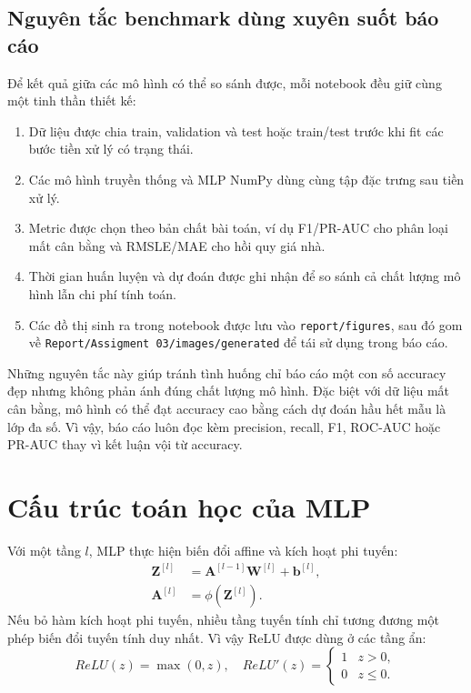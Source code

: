 \documentclass[12pt,a4paper]{report}
\newcommand{\modelpath}[1]{\texttt{#1}}
\begin{document}
\subsection{Nguyên tắc benchmark dùng xuyên suốt báo cáo}
Để kết quả giữa các mô hình có thể so sánh được, mỗi notebook đều giữ cùng một tinh thần thiết kế:
\begin{enumerate}
    \item Dữ liệu được chia train, validation và test hoặc train/test trước khi fit các bước tiền xử lý có trạng thái.
    \item Các mô hình truyền thống và MLP NumPy dùng cùng tập đặc trưng sau tiền xử lý.
    \item Metric được chọn theo bản chất bài toán, ví dụ F1/PR-AUC cho phân loại mất cân bằng và RMSLE/MAE cho hồi quy giá nhà.
    \item Thời gian huấn luyện và dự đoán được ghi nhận để so sánh cả chất lượng mô hình lẫn chi phí tính toán.
    \item Các đồ thị sinh ra trong notebook được lưu vào \modelpath{report/figures}, sau đó gom về \modelpath{Report/Assigment 03/images/generated} để tái sử dụng trong báo cáo.
\end{enumerate}

Những nguyên tắc này giúp tránh tình huống chỉ báo cáo một con số accuracy đẹp nhưng không phản ánh đúng chất lượng mô hình.
Đặc biệt với dữ liệu mất cân bằng, mô hình có thể đạt accuracy cao bằng cách dự đoán hầu hết mẫu là lớp đa số.
Vì vậy, báo cáo luôn đọc kèm precision, recall, F1, ROC-AUC hoặc PR-AUC thay vì kết luận vội từ accuracy.

\section{Cấu trúc toán học của MLP}
Với một tầng $l$, MLP thực hiện biến đổi affine và kích hoạt phi tuyến:
\begin{align}
    \mathbf{Z}^{[l]} &= \mathbf{A}^{[l-1]}\mathbf{W}^{[l]} + \mathbf{b}^{[l]}, \\
    \mathbf{A}^{[l]} &= \phi(\mathbf{Z}^{[l]}).
\end{align}
Nếu bỏ hàm kích hoạt phi tuyến, nhiều tầng tuyến tính chỉ tương đương một phép biến đổi tuyến tính duy nhất. Vì vậy ReLU được dùng ở các tầng ẩn:
\begin{equation}
    ReLU(z) = \max(0, z), \quad
    ReLU'(z) =
    \begin{cases}
        1 & z > 0,\\
        0 & z \le 0.
    \end{cases}
\end{equation}
\end{document}
